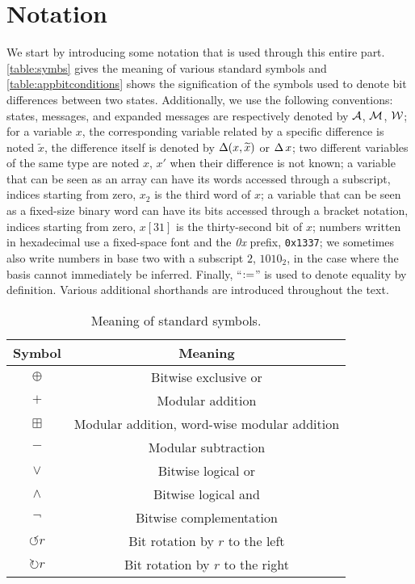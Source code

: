 \section{Notation}
\label{sec:not}

We start by introducing some notation that is used through this entire part.
\autoref{table:symbs} gives the meaning of various standard symbols and \autoref{table:appbitconditions} shows the signification of the symbols used to denote bit differences between two states.
Additionally, we use the following conventions: \shaone states, messages, and expanded messages are respectively denoted by $\mathcal{A}$, $\mathcal{M}$, $\mathcal{W}$; for a variable $x$, the corresponding variable related by a specific
difference is noted $\widetilde{x}$, the difference itself is denoted by $\operatorname{\Delta}(x,\widetilde{x})$ or $\operatorname{\Delta} x$; two different variables of the same type are noted $x$, $x'$ when their difference is not known;
a variable that can be seen as an array can have its words accessed through a subscript, indices starting from zero, \eg $x_2$ is the third word of $x$; a variable that can be seen as a fixed-size binary word
can have its bits accessed through a bracket notation, indices starting from zero, \eg $x[31]$ is the thirty-second bit of $x$;
numbers written in hexadecimal use a fixed-space font and the \emph{0x} prefix, \eg \texttt{0x1337}; we sometimes also write numbers in base two with a subscript $2$,
\eg $1010_2$, in the case
where the basis cannot immediately be inferred. Finally, ``$:=$'' is used to denote equality by definition.
Various additional shorthands are introduced throughout the text.

\begin{table}[!htb]
\caption{Meaning of standard symbols.}\label{table:symbs}
\begin{center}
\begin{tabular}{c c}
\toprule
Symbol & Meaning\\
\midrule
$\oplus$ & Bitwise exclusive or\\
$+$ & Modular addition\\
$\boxplus$ & Modular addition, word-wise modular addition\\
$-$ & Modular subtraction\\
$\vee$ & Bitwise logical or\\
$\wedge$ & Bitwise logical and\\
$\neg$ & Bitwise complementation\\
$\circlearrowleft r$ & Bit rotation by $r$ to the left\\
$\circlearrowright r$ & Bit rotation by $r$ to the right\\
\bottomrule
\end{tabular}
\end{center}
\end{table}

